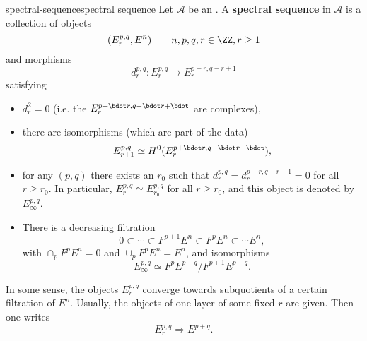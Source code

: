 \begin{topic}{spectral-sequence}{spectral sequence}
    Let $\mathcal{A}$ be an . A \textbf{spectral sequence} in $\mathcal{A}$ is a collection of objects
    \[ (E_r^{p, q}, E^n) \qquad n, p, q, r \in \ZZ, r \ge 1 \]
    and morphisms
    \[ d_r^{p, q} : E_r^{p, q} \to E_r^{p + r, q - r + 1} \]
    satisfying
    \begin{itemize}
        \item $d_r^2 = 0$ (i.e. the $E_r^{p + \bdot r, q - \bdot r + \bdot}$ are complexes),
        \item there are isomorphisms (which are part of the data)
        \[ E_{r + 1}^{p, q} \simeq H^0(E_r^{p + \bdot r, q - \bdot r + \bdot}), \]
        \item for any $(p, q)$ there exists an $r_0$ such that $d_r^{p, q} = d_r^{p - r, q + r - 1} = 0$ for all $r \ge r_0$. In particular, $E_r^{p, q} \simeq E_{r_0}^{p, q}$ for all $r \ge r_0$, and this object is denoted by $E_\infty^{p, q}$.
        \item There is a decreasing filtration
        \[ 0 \subset \cdots \subset F^{p + 1} E^n \subset F^p E^n \subset \cdots E^n , \]
        with $\cap_p F^p E^n = 0$ and $\cup_p F^p E^n = E^n$, and isomorphisms
        \[ E_\infty^{p, q} \simeq F^p E^{p + q} / F^{p + 1} E^{p + q} . \]
    \end{itemize}
    
    In some sense, the objects $E_r^{p, q}$ converge towards subquotients of a certain filtration of $E^n$. Usually, the objects of one layer of some fixed $r$ are given. Then one writes
    \[ E_r^{p, q} \Rightarrow E^{p + q} . \]
\end{topic}
